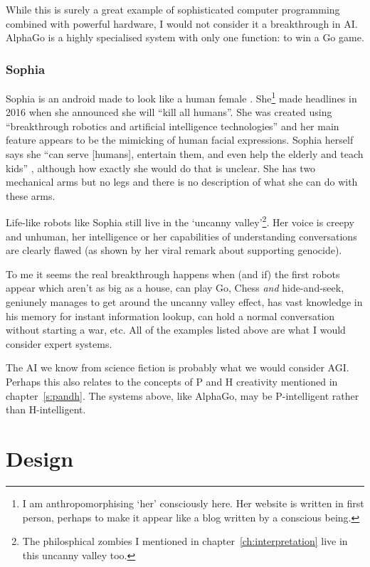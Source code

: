 While this is surely a great example of sophisticated computer programming combined with powerful hardware, I would not consider it a breakthrough in \ac{AI}. AlphaGo is a highly specialised system with only one function: to win a Go game.

\subsubsection{Sophia}
Sophia is an android made to look like a human female \autocite{Sophia2016,Hanson2016}. She\footnote{I am anthropomorphising `her' consciously here. Her website is written in first person, perhaps to make it appear like a blog written by a conscious being.} made headlines in 2016 when she announced she will ``kill all humans''. She was created using ``breakthrough robotics and artificial intelligence technologies'' and her main feature appears to be the mimicking of human facial expressions. Sophia herself says she ``can serve [humans], entertain them, and even help the elderly and teach kids'' \autocite*{Sophia2016}, although how exactly she would do that is unclear. She has two mechanical arms but no legs and there is no description of what she can do with these arms.

Life-like robots like Sophia still live in the `uncanny valley'\footnote{The philosphical zombies I mentioned in chapter~\ref{ch:interpretation} live in this uncanny valley too.}. Her voice is creepy and unhuman, her intelligence or her capabilities of understanding conversations are clearly flawed (as shown by her viral remark about supporting genocide).

\spirals

To me it seems the real breakthrough happens when (and if) the first robots appear which aren't as big as a house, can play Go, Chess \textit{and} hide-and-seek, geniunely manages to get around the uncanny valley effect, has vast knowledge in his memory for instant information lookup, can hold a normal conversation without starting a war, etc. All of the examples listed above are what I would consider expert systems. 

The \ac{AI} we know from science fiction is probably what we would consider \ac{AGI}. Perhaps this also relates to the concepts of P and H creativity mentioned in chapter~\ref{s:pandh}. The systems above, like AlphaGo, may be P-intelligent rather than H-intelligent.


\section{Design}
\label{s:designanal}

